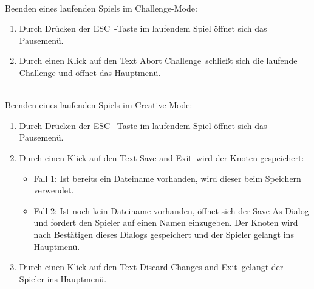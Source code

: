 \begin{description}
\begin{enumerate}
	\end{enumerate}
	
\clearpage
	
	~\\Beenden eines laufenden Spiels im Challenge-Mode:

	\begin{enumerate} 
	
		\item Durch Drücken der \glqq ESC\grqq~-Taste im laufendem Spiel öffnet sich das Pausemenü.
		
		\item Durch einen Klick auf den Text  \glqq Abort Challenge\grqq~schließt sich die laufende Challenge und öffnet das Hauptmenü.
		
	\end{enumerate}
	
		~\\Beenden eines laufenden Spiels im Creative-Mode:

	\begin{enumerate} 
	
		\item Durch Drücken der \glqq ESC\grqq~-Taste im laufendem Spiel öffnet sich das Pausemenü.
		
		\item Durch einen Klick auf den Text \glqq Save and Exit\grqq~wird der Knoten gespeichert:
		
		\begin{itemize}
		
			\item Fall 1: Ist bereits ein Dateiname vorhanden, wird dieser beim Speichern verwendet.
			
			\item Fall 2: Ist noch kein Dateiname vorhanden, öffnet sich der \glqq Save As\grqq-Dialog und fordert den Spieler auf einen Namen einzugeben. Der Knoten wird nach Bestätigen dieses Dialogs gespeichert und der Spieler gelangt ins Hauptmenü.\\
		
		\end{itemize}
		
		
		\item Durch einen Klick auf den Text \glqq Discard Changes and Exit\grqq~gelangt der Spieler ins Hauptmenü.	
		~\\	
		
	\end{enumerate}
	

	

\end{description}
